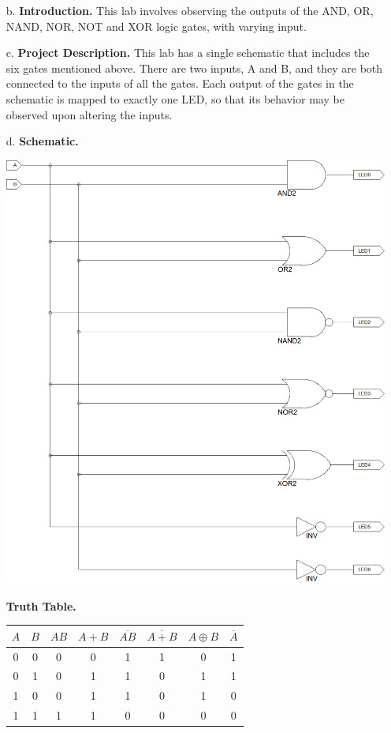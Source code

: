 \documentclass[9pt]{article}
\begin{document}
\begin{enumerate}
   \item[b.] \textbf{Introduction.} This lab involves observing the outputs of
             the AND, OR, NAND, NOR, NOT and XOR logic gates, with varying
             input.
   \item[c.] \textbf{Project Description.} This lab has a single schematic that
            includes the six gates mentioned above. There are two inputs, A and
            B, and they are both connected to the inputs of all the gates. Each
            output of the gates in the schematic is mapped to exactly one LED,
            so that its behavior may be observed upon altering the inputs.
  	\item[d.] \textbf{Schematic.}
             \begin{center}
                \includegraphics[width=\textwidth]{schematic.png}
             \end{center}
             
             \textbf{Truth Table.}   
   
   \begin{center}
    \begin{tabular}{@{}|c|c|c|c|c|c|c|c|@{}}
   \hline
   $A$ & $B$ & $AB$ & $A+B$ & $\overline{AB}$ & $\overline{A+B}$ & $A \oplus B$ & $\overline{A}$ \\ 
   \hline
   0 & 0 & 0 & 0 & 1 & 1 & 0 & 1 \\
   \hline
   0 & 1 & 0 & 1 & 1 & 0 & 1 & 1 \\
   \hline
   1 & 0 & 0 & 1 & 1 & 0 & 1 & 0 \\
   \hline
   1 & 1 & 1 & 1 & 0 & 0 & 0 & 0 \\
   \hline
\end{tabular}
   \end{center}
\end{enumerate}
\end{document}
